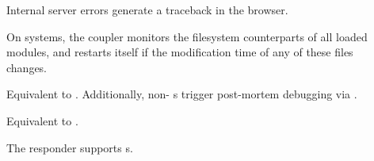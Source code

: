 \begin{description}

\item[]
    Internal server errors generate a traceback in the browser.

    On \UNIX{} systems, the  coupler monitors the filesystem
    counterparts of all loaded modules, and restarts itself if the modification
    time of any of these files changes.

\item[]
    Equivalent to . Additionally, non-
    s trigger post-mortem debugging via
    .

\item[]
    Equivalent to .

\item[]
    The  responder supports s.

\end{description}

